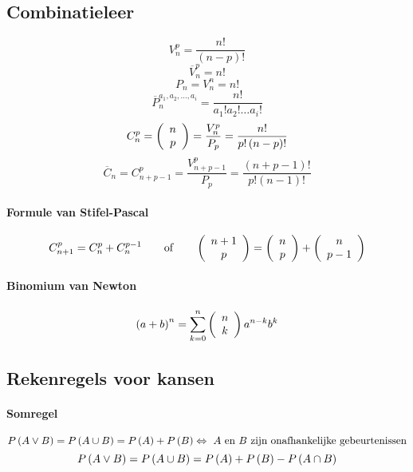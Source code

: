 
\subsection{Combinatieleer}
\label{sec:Combinatieleer}

\[
   V^p_n = \frac{n!}{\left(n-p\right)!}
\]
\[
  \overline{V}^p_n = n!
\]
\[
  P_n = V^n_n = n!
\]
\[
  \overline{P}^{a_1,a_2,\ldots,a_i}_n = \frac{n!}{a_1!a_2!\ldots a_i!}
\]
\[
  C^p_n =  \left( \begin{array}{c} n \\ p \end{array} \right) = \frac{V^p_n}{P_p} = \frac{n!}{p!\left(n-p\right)!}
\]
\[
  \overline{C}_n = C^p_{n+p-1} = \frac{V^p_{n+p-1}}{P_p} = \frac{\left(n+p-1\right)!}{p!\left(n-1\right)!}
\]
\paragraph{Formule van Stifel-Pascal}
\[
  C^p_{n+1} = C^p_n + C_n^{p-1} \qquad \mbox{of} \qquad \left( \begin{array}{c} n+1 \\ p \end{array} \right) = \left( \begin{array}{c} n \\ p \end{array} \right) + \left( \begin{array}{c} n \\ p-1 \end{array} \right)
\]
\paragraph{Binomium van Newton}
\[
  \left(a+b\right)^n = \sum_{k=0}^n \left( \begin{array}{c} n \\ k \end{array} \right) a^{n-k}b^k
\]

\scriptsize
{}
%
\normalsize

\subsection{Rekenregels voor kansen}
\label{sec:RekenregelsVoorKansen}


\paragraph{Somregel}
\[
  P\left(A \vee B\right) = P\left(A \cup B\right) = P\left(A\right) + P\left(B\right)
  \Leftrightarrow
  \mbox{ $A$ en $B$ zijn onafhankelijke gebeurtenissen}
\]
\[
  P\left(A \vee B\right) = P\left(A \cup B\right) = P\left(A\right) + P\left(B\right) - P\left(A \cap B\right)
\]


